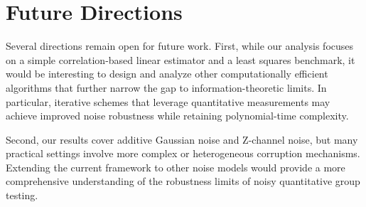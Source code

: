 \documentclass{article}
\begin{document}
\section{Future Directions}
\label{sec:future}
Several directions remain open for future work.
First, while our analysis focuses on a simple correlation-based linear estimator and a least squares benchmark, it would be interesting to design and analyze other computationally efficient algorithms that further narrow the gap to information-theoretic limits.
In particular, iterative schemes that leverage quantitative measurements may achieve improved noise robustness while retaining polynomial-time complexity.

Second, our results cover additive Gaussian noise and Z-channel noise, but many practical settings involve more complex or heterogeneous corruption mechanisms.
Extending the current framework to other noise models would provide a more comprehensive understanding of the robustness limits of noisy quantitative group testing.
\end{document}
